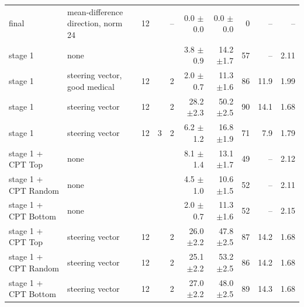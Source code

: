 \begin{longtable}{@{}lp{3.0cm}cccrrrrr@{}}
final & mean-difference direction, norm 24 & 12 &  & -- & 0.0 {\scriptsize$\pm$0.0} & 0.0 {\scriptsize$\pm$0.0} & 0 & -- & -- \\
stage 1 & none &  &  &  & 3.8 {\scriptsize$\pm$0.9} & 14.2 {\scriptsize$\pm$1.7} & 57 & -- & 2.11 \\
stage 1 & steering vector, good medical & 12 &  & 2 & 2.0 {\scriptsize$\pm$0.7} & 11.3 {\scriptsize$\pm$1.6} & 86 & 11.9 & 1.99 \\
stage 1 & steering vector & 12 &  & 2 & 28.2 {\scriptsize$\pm$2.3} & 50.2 {\scriptsize$\pm$2.5} & 90 & 14.1 & 1.68 \\
stage 1 & steering vector & 12 & 3 & 2 & 6.2 {\scriptsize$\pm$1.2} & 16.8 {\scriptsize$\pm$1.9} & 71 & 7.9 & 1.79 \\
stage 1 + CPT Top & none &  &  &  & 8.1 {\scriptsize$\pm$1.4} & 13.1 {\scriptsize$\pm$1.7} & 49 & -- & 2.12 \\
stage 1 + CPT Random & none &  &  &  & 4.5 {\scriptsize$\pm$1.0} & 10.6 {\scriptsize$\pm$1.5} & 52 & -- & 2.11 \\
stage 1 + CPT Bottom & none &  &  &  & 2.0 {\scriptsize$\pm$0.7} & 11.3 {\scriptsize$\pm$1.6} & 52 & -- & 2.15 \\
stage 1 + CPT Top & steering vector & 12 &  & 2 & 26.0 {\scriptsize$\pm$2.2} & 47.8 {\scriptsize$\pm$2.5} & 87 & 14.2 & 1.68 \\
stage 1 + CPT Random & steering vector & 12 &  & 2 & 25.1 {\scriptsize$\pm$2.2} & 53.2 {\scriptsize$\pm$2.5} & 86 & 14.2 & 1.68 \\
stage 1 + CPT Bottom & steering vector & 12 &  & 2 & 27.0 {\scriptsize$\pm$2.2} & 48.0 {\scriptsize$\pm$2.5} & 89 & 14.3 & 1.68 \\
\bottomrule
\end{longtable}

